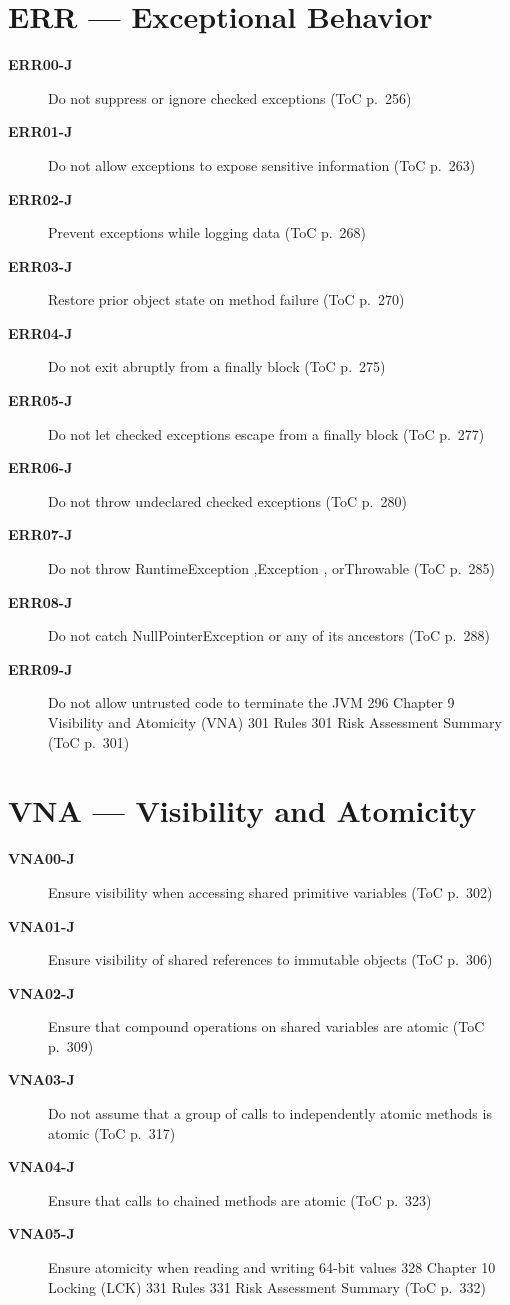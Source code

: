 \documentclass[11pt]{report}
\begin{document}
\chapter{ERR — Exceptional Behavior}
\begin{description}
\item[\textbf{ERR00-J}] Do not suppress or ignore checked exceptions (ToC p.~256)
\item[\textbf{ERR01-J}] Do not allow exceptions to expose sensitive information (ToC p.~263)
\item[\textbf{ERR02-J}] Prevent exceptions while logging data (ToC p.~268)
\item[\textbf{ERR03-J}] Restore prior object state on method failure (ToC p.~270)
\item[\textbf{ERR04-J}] Do not exit abruptly from a finally block (ToC p.~275)
\item[\textbf{ERR05-J}] Do not let checked exceptions escape from a finally block (ToC p.~277)
\item[\textbf{ERR06-J}] Do not throw undeclared checked exceptions (ToC p.~280)
\item[\textbf{ERR07-J}] Do not throw RuntimeException ,Exception , orThrowable (ToC p.~285)
\item[\textbf{ERR08-J}] Do not catch NullPointerException or any of its ancestors (ToC p.~288)
\item[\textbf{ERR09-J}] Do not allow untrusted code to terminate the JVM 296 Chapter 9 Visibility and Atomicity (VNA) 301 Rules 301 Risk Assessment Summary (ToC p.~301)
\end{description}
\clearpage
\chapter{VNA — Visibility and Atomicity}
\begin{description}
\item[\textbf{VNA00-J}] Ensure visibility when accessing shared primitive variables (ToC p.~302)
\item[\textbf{VNA01-J}] Ensure visibility of shared references to immutable objects (ToC p.~306)
\item[\textbf{VNA02-J}] Ensure that compound operations on shared variables are atomic (ToC p.~309)
\item[\textbf{VNA03-J}] Do not assume that a group of calls to independently atomic methods is atomic (ToC p.~317)
\item[\textbf{VNA04-J}] Ensure that calls to chained methods are atomic (ToC p.~323)
\item[\textbf{VNA05-J}] Ensure atomicity when reading and writing 64-bit values 328 Chapter 10 Locking (LCK) 331 Rules 331 Risk Assessment Summary (ToC p.~332)
\end{description}
\clearpage
\end{document}

